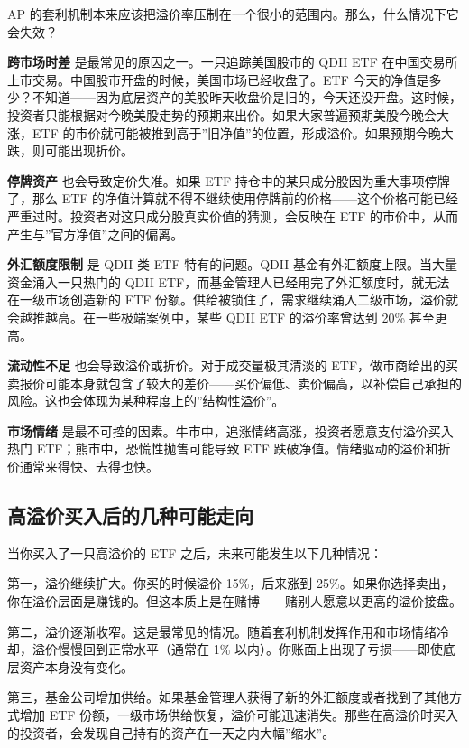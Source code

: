 \documentclass[a4paper,11pt,oneside,fontset=none,UTF8,zihao=-4]{ctexbook}
\begin{document}
AP
的套利机制本来应该把溢价率压制在一个很小的范围内。那么，什么情况下它会失效？

\textbf{跨市场时差} 是最常见的原因之一。一只追踪美国股市的 QDII ETF
在中国交易所上市交易。中国股市开盘的时候，美国市场已经收盘了。ETF
今天的净值是多少？不知道------因为底层资产的美股昨天收盘价是旧的，今天还没开盘。这时候，投资者只能根据对今晚美股走势的预期来出价。如果大家普遍预期美股今晚会大涨，ETF
的市价就可能被推到高于''旧净值''的位置，形成溢价。如果预期今晚大跌，则可能出现折价。

\textbf{停牌资产} 也会导致定价失准。如果 ETF
持仓中的某只成分股因为重大事项停牌了，那么 ETF
的净值计算就不得不继续使用停牌前的价格------这个价格可能已经严重过时。投资者对这只成分股真实价值的猜测，会反映在
ETF 的市价中，从而产生与''官方净值''之间的偏离。

\textbf{外汇额度限制} 是 QDII 类 ETF 特有的问题。QDII
基金有外汇额度上限。当大量资金涌入一只热门的 QDII
ETF，而基金管理人已经用完了外汇额度时，就无法在一级市场创造新的 ETF
份额。供给被锁住了，需求继续涌入二级市场，溢价就会越推越高。在一些极端案例中，某些
QDII ETF 的溢价率曾达到 20\% 甚至更高。

\textbf{流动性不足} 也会导致溢价或折价。对于成交量极其清淡的
ETF，做市商给出的买卖报价可能本身就包含了较大的差价------买价偏低、卖价偏高，以补偿自己承担的风险。这也会体现为某种程度上的''结构性溢价''。

\textbf{市场情绪}
是最不可控的因素。牛市中，追涨情绪高涨，投资者愿意支付溢价买入热门
ETF；熊市中，恐慌性抛售可能导致 ETF
跌破净值。情绪驱动的溢价和折价通常来得快、去得也快。

\subsection{高溢价买入后的几种可能走向}\label{ux9ad8ux6ea2ux4ef7ux4e70ux5165ux540eux7684ux51e0ux79cdux53efux80fdux8d70ux5411}

当你买入了一只高溢价的 ETF 之后，未来可能发生以下几种情况：

第一，溢价继续扩大。你买的时候溢价 15\%，后来涨到
25\%。如果你选择卖出，你在溢价层面是赚钱的。但这本质上是在赌博------赌别人愿意以更高的溢价接盘。

第二，溢价逐渐收窄。这是最常见的情况。随着套利机制发挥作用和市场情绪冷却，溢价慢慢回到正常水平（通常在
1\% 以内）。你账面上出现了亏损------即使底层资产本身没有变化。

第三，基金公司增加供给。如果基金管理人获得了新的外汇额度或者找到了其他方式增加
ETF
份额，一级市场供给恢复，溢价可能迅速消失。那些在高溢价时买入的投资者，会发现自己持有的资产在一天之内大幅''缩水''。
\end{document}
